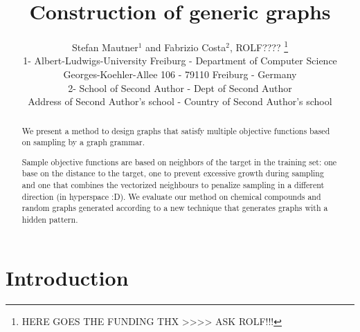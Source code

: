 \documentclass{esannV2} \usepackage[dvips]{graphicx}
\begin{document}
 \title{Construction of generic graphs}
\author{Stefan Mautner$^1$ and Fabrizio Costa$^2$, ROLF????
%
\thanks{HERE GOES THE FUNDING THX >>>> ASK ROLF!!!}
%
\vspace{.3cm}\\
%
1- Albert-Ludwigs-University Freiburg  - Department of Computer Science \\
Georges-Koehler-Allee 106  - 79110 Freiburg - Germany
\vspace{.1cm}\\ 2- School of Second Author - Dept of Second Author \\ Address
of Second Author's school - Country of Second Author's school\\ } \maketitle





\begin{abstract}

 We present a method to design graphs that satisfy multiple
    objective functions based on sampling by a graph grammar.

Sample objective functions are based on neighbors of the target in the training
    set: one base on the distance to the target, one to prevent excessive
    growth during sampling and one that combines the vectorized neighbours to
    penalize sampling in a different direction (in hyperspace :D).  We evaluate
    our method on chemical compounds and random graphs generated according to a
    new technique that generates graphs with a hidden pattern.

\end{abstract}

\section{Introduction}
\end{document}
